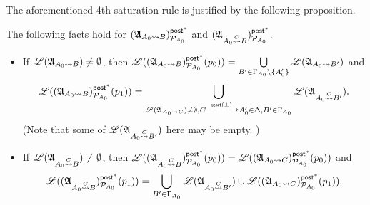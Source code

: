 \smallskip

The aforementioned 4th saturation rule is justified by the following proposition. 

\begin{proposition} \label{prop-lm-A0-post}
The following facts hold for $({\mathfrak{A} }_{A_0 \rightsquigarrow B})^{{\mathsf{post} }^*}_{{\mathcal{P} }_{A_0}}$ and $({\mathfrak{A} }_{A_0\stackrel{C}\rightsquigarrow B})^{{\mathsf{post} }^*}_{{\mathcal{P} }_{A_0}}$.
\begin{itemize}
    \item If $ {\mathscr{L} }({\mathfrak{A} }_{A_0 \rightsquigarrow B}) \neq \emptyset$, then ${\mathscr{L} }(({\mathfrak{A} }_{A_0 \rightsquigarrow B})^{{\mathsf{post} }^*}_{{\mathcal{P} }_{A_0}}(p_0)) = \bigcup\limits_{B' \in \Gamma_{A_0}\setminus\{A_0'\}} {\mathscr{L} }({\mathfrak{A} }_{A_0\rightsquigarrow B'})$ and
    $${\mathscr{L} }(({\mathfrak{A} }_{A_0 \rightsquigarrow B})^{{\mathsf{post} }^*}_{{\mathcal{P} }_{A_0}}(p_1))  = \bigcup\limits_{{\mathscr{L} }({\mathfrak{A} }_{A_0\rightsquigarrow C})\neq\emptyset,C \xrightarrow{{\mathsf{start} }(\bot)}A'_0 \in \Delta, B' \in \Gamma_{A_0}} {\mathscr{L} }({\mathfrak{A} }_{A_0\stackrel{C}\rightsquigarrow B'}).$$
        (Note that some of ${\mathscr{L} }({\mathfrak{A} }_{A_0\stackrel{C}\rightsquigarrow B'})$ here may be empty. ) 
%

%
    \item If $ {\mathscr{L} }({\mathfrak{A} }_{A_0\stackrel{C}\rightsquigarrow B}) \neq \emptyset$, then ${\mathscr{L} }(({\mathfrak{A} }_{A_0\stackrel{C}\rightsquigarrow B})^{{\mathsf{post} }^*}_{{\mathcal{P} }_{A_0}}(p_0)) = {\mathscr{L} }(({\mathfrak{A} }_{A_0 \rightsquigarrow C})^{{\mathsf{post} }^*}_{{\mathcal{P} }_{A_0}}(p_0))$ and 
    $${\mathscr{L} }(({\mathfrak{A} }_{A_0\stackrel{C}\rightsquigarrow B})^{{\mathsf{post} }^*}_{{\mathcal{P} }_{A_0}}(p_1)) = 
    \bigcup\limits_{B'\in\Gamma_{A_0}}{\mathscr{L} }({\mathfrak{A} }_{A_0\stackrel{C}\rightsquigarrow B'}) \cup  {\mathscr{L} }(({\mathfrak{A} }_{A_0 \rightsquigarrow C})^{{\mathsf{post} }^*}_{{\mathcal{P} }_{A_0}}(p_1)).$$
\end{itemize}
\end{proposition}

